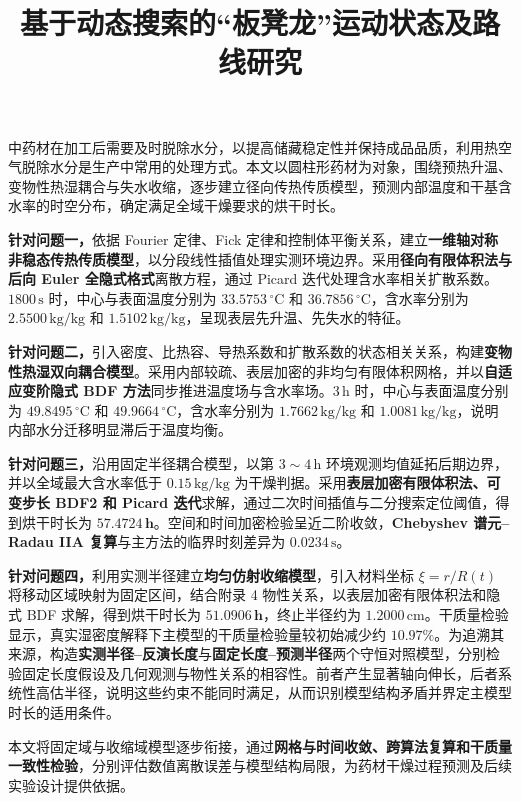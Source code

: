\documentclass[withoutpreface,bwprint]{cumcmthesis}
\title{基于动态搜索的“板凳龙”运动状态及路线研究}
\makeatletter
\renewenvironment{abstract}{%
\if@twocolumn
    \section*{\abstractname}%
  \else
   \begin{center}%
  {\zihao{4}\bfseries \abstractname\vspace{-.5em}\vspace{\z@}}%
   \end{center}%
   \quotation
  \fi}
  {\if@twocolumn\else\endquotation\clearpage\fi}
\makeatother
\begin{document}
\maketitle

\begin{abstract}
中药材在加工后需要及时脱除水分，以提高储藏稳定性并保持成品品质，利用热空气脱除水分是生产中常用的处理方式。本文以圆柱形药材为对象，围绕预热升温、变物性热湿耦合与失水收缩，逐步建立径向传热传质模型，预测内部温度和干基含水率的时空分布，确定满足全域干燥要求的烘干时长。

\textbf{针对问题一，}依据 Fourier 定律、Fick 定律和控制体平衡关系，建立\textbf{一维轴对称非稳态传热传质模型}，以分段线性插值处理实测环境边界。采用\textbf{径向有限体积法与后向 Euler 全隐式格式}离散方程，通过 Picard 迭代处理含水率相关扩散系数。$1800\,\mathrm{s}$ 时，中心与表面温度分别为 $33.5753\,{}^\circ\mathrm{C}$ 和 $36.7856\,{}^\circ\mathrm{C}$，含水率分别为 $2.5500\,\mathrm{kg/kg}$ 和 $1.5102\,\mathrm{kg/kg}$，呈现表层先升温、先失水的特征。

\textbf{针对问题二，}引入密度、比热容、导热系数和扩散系数的状态相关关系，构建\textbf{变物性热湿双向耦合模型}。采用内部较疏、表层加密的非均匀有限体积网格，并以\textbf{自适应变阶隐式 BDF 方法}同步推进温度场与含水率场。$3\,\mathrm{h}$ 时，中心与表面温度分别为 $49.8495\,{}^\circ\mathrm{C}$ 和 $49.9664\,{}^\circ\mathrm{C}$，含水率分别为 $1.7662\,\mathrm{kg/kg}$ 和 $1.0081\,\mathrm{kg/kg}$，说明内部水分迁移明显滞后于温度均衡。

\textbf{针对问题三，}沿用固定半径耦合模型，以第 $3\sim4\,\mathrm{h}$ 环境观测均值延拓后期边界，并以全域最大含水率低于 $0.15\,\mathrm{kg/kg}$ 为干燥判据。采用\textbf{表层加密有限体积法、可变步长 BDF2 和 Picard 迭代}求解，通过二次时间插值与二分搜索定位阈值，得到烘干时长为 $\mathbf{57.4724\,h}$。空间和时间加密检验呈近二阶收敛，\textbf{Chebyshev 谱元--Radau IIA 复算}与主方法的临界时刻差异为 $0.0234\,\mathrm{s}$。

\textbf{针对问题四，}利用实测半径建立\textbf{均匀仿射收缩模型}，引入材料坐标 $\xi=r/R(t)$ 将移动区域映射为固定区间，结合附录 4 物性关系，以表层加密有限体积法和隐式 BDF 求解，得到烘干时长为 $\mathbf{51.0906\,h}$，终止半径约为 $1.2000\,\mathrm{cm}$。干质量检验显示，真实湿密度解释下主模型的干质量检验量较初始减少约 $10.97\%$。为追溯其来源，构造\textbf{实测半径--反演长度}与\textbf{固定长度--预测半径}两个守恒对照模型，分别检验固定长度假设及几何观测与物性关系的相容性。前者产生显著轴向伸长，后者系统性高估半径，说明这些约束不能同时满足，从而识别模型结构矛盾并界定主模型时长的适用条件。

本文将固定域与收缩域模型逐步衔接，通过\textbf{网格与时间收敛、跨算法复算和干质量一致性检验}，分别评估数值离散误差与模型结构局限，为药材干燥过程预测及后续实验设计提供依据。

\end{abstract}
\end{document}
